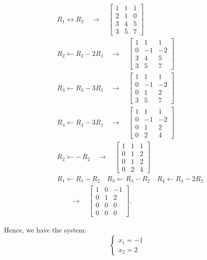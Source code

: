 \documentclass{article}
\begin{document}
\begin{align*}
& R_1 \leftrightarrow R_2 
\quad \longrightarrow 
\quad
\left[
\begin{array}{cc|c}
1 & 1 & 1 \\
2 & 1 & 0 \\
3 & 4 & 5 \\
3 & 5 & 7
\end{array}
\right] \\
& R_2 \leftarrow R_2 - 2R_1 
\quad \longrightarrow 
\quad
\left[
\begin{array}{cc|c}
1 & 1 & 1\\
0 & -1 & -2\\
3 & 4 & 5\\
3 & 5 & 7
\end{array}
\right] \\
& R_3 \leftarrow R_3 - 3R_1 
\quad \longrightarrow 
\quad
\left[
\begin{array}{cc|c}
1 & 1 & 1 \\
0 & -1 & -2 \\
0 & 1 & 2 \\
3 & 5 & 7
\end{array}
\right] \\
& R_4 \leftarrow R_4 - 3R_1 
\quad \longrightarrow 
\quad
\left[
\begin{array}{cc|c}
1 & 1 & 1 \\
0 & -1 & -2 \\
0 & 1 & 2 \\
0 & 2 & 4
\end{array}
\right] \\
& R_2 \leftarrow -\,R_2 
\quad \longrightarrow 
\quad
\left[
\begin{array}{cc|c}
1 & 1 & 1 \\
0 & 1 & 2 \\
0 & 1 & 2 \\
0 & 2 & 4
\end{array}
\right] \\
& R_1 \leftarrow R_1 - R_2 
\quad R_3 \leftarrow R_3 - R_2 
\quad R_4 \leftarrow R_4 - 2R_2 
\\
&\qquad \longrightarrow 
\quad
\left[
\begin{array}{cc|c}
1 & 0 & -1 \\
0 & 1 & 2 \\
0 & 0 & 0 \\
0 & 0 & 0
\end{array}
\right].
\end{align*}

Hence, we have the system:
\[
\begin{cases}
x_1 = -1 \\
x_2 = 2
\end{cases}
\]
\end{document}
